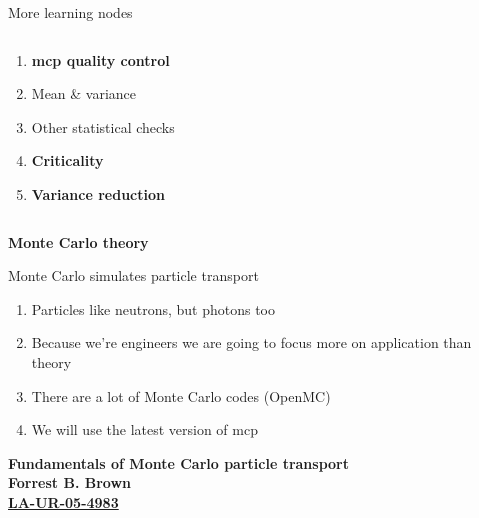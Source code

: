 \documentclass[aspectratio=1610,pdftex,dvipsnames,compress,xcolor={dvipsnames}]{beamer}
\newcommand{\acs}{\acrshort} %
\begin{document}
\begin{frame}[t]{More learning nodes}
    \begin{columns}[t]

        \begin{column}{0.50\textwidth}
            \begin{enumerate}[series=outerlist,topsep=0pt,itemsep=1pt,leftmargin=*,label=(\arabic*)]
                \item[]\textbf{\acs{mcp} quality control}
                \item[]Mean \& variance
                \item[]Other statistical checks
                    \vspace{0.15in}
                \item[]\textbf{Criticality}
                    \vspace{0.15in}
                \item[]\textbf{Variance reduction}
            \end{enumerate}
        \end{column}

        \begin{column}{0.50\textwidth}
        \end{column}

    \end{columns}
\end{frame}


\begin{frame}[plain]{}
    \centering\LARGE\textbf{Monte Carlo theory}
\end{frame}


\addtocounter{framenumber}{-1} 
\begin{frame}{Monte Carlo simulates particle transport}
    \begin{enumerate}[series=outerlist,topsep=0pt,itemsep=21pt,leftmargin=*,label=(\arabic*)]
        \item[]Particles like neutrons, but photons too
        \item[]Because we're engineers we are going to focus more on application than theory
        \item[]There are a lot of Monte Carlo codes (OpenMC)
        \item[]We will use the latest version of \acs{mcp}
    \end{enumerate}
\end{frame}


\begin{frame}[plain]{}
    \centering\LARGE\textbf{Fundamentals of Monte Carlo particle transport}\\
    \centering\LARGE\textbf{Forrest B. Brown}\\
    \centering\LARGE\textbf{\href{https://mcnp.lanl.gov/pdf_files/TechReport_2005_LANL_LA-UR-05-4983_Brown.pdf}{LA-UR-05-4983}}
\end{frame}
\end{document}
